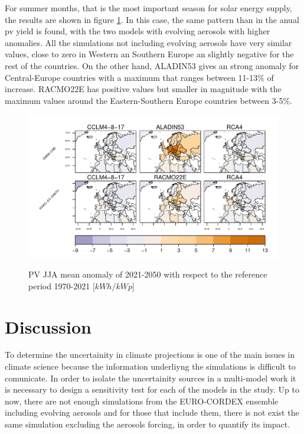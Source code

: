For summer months, that is the most important season for solar energy supply, the results are shown in figure \ref{fig:pvcountryjja}. In this case, the same pattern than in the anual pv yield is found, with the two models with evolving aerosols with higher anomalies. All the simulations not including evolving aerosols have very similar values, close to zero in Western an Southern Europe an slightly negative for the rest of the countries. On the other hand, ALADIN53 gives an strong anomaly for Central-Europe countries with a maximum that ranges between 11-13\% of increase. RACMO22E has positive values but smaller in magnitude with the maximum values around the Eastern-Southern Europe countries between 3-5\%.

\begin{figure}[h!]
    \includegraphics[width=1\textwidth]{figs/capitulo7/bycountryJJArelativePuOr.pdf}
    \label{fig:pvcountryjja}
  \caption{PV JJA mean anomaly of 2021-2050 with respect to the reference period 1970-2021 [$kWh/kWp$]}
\end{figure}



\section{Discussion}

To determine the uncertainity in climate projections is one of the main issues in climate science because the information underliyng the simulations is difficult to comunicate. In order to isolate the uncertainity sources in a multi-model work it is necessary to design a sensitivity test for each of the models in the study. Up to now, there are not enough simulations from the EURO-CORDEX ensemble including evolving aerosols and for those that include them, there is not exist the same simulation excluding the aerosols forcing, in order to quantify its impact.

